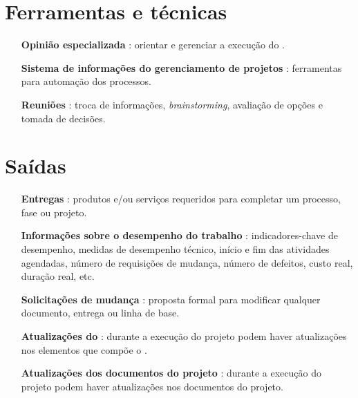 \section{Ferramentas e técnicas}

\begin{itemize}
	
	\item[\textbf{Opinião especializada}]: orientar e gerenciar a execução do \planproj.
	
	\item[\textbf{Sistema de informações do gerenciamento de projetos}]: ferramentas para automação dos processos.
	
	\item[\textbf{Reuniões}]: troca de informações, \textit{brainstorming}, avaliação de opções e tomada de decisões.
	
\end{itemize}

\section{Saídas}

\begin{itemize}

	\item[\textbf{Entregas}] : produtos e/ou serviços requeridos para completar um processo, fase ou projeto.
	
	\item[\textbf{Informações sobre o desempenho do trabalho}] : indicadores-chave de desempenho, medidas de desempenho técnico, início e fim das atividades agendadas, número de requisições de mudança, número de defeitos, custo real, duração real, etc.
	
	\item[\textbf{Solicitações de mudança}] : proposta formal para modificar qualquer documento, entrega ou linha de base.

	\item[\textbf{Atualizações do \planproj}] :	durante a execução do projeto podem haver atualizações nos elementos que compõe o \planproj.

	\item[\textbf{Atualizações dos documentos do projeto}] : durante a execução do projeto podem haver atualizações nos documentos do projeto.

\end{itemize}


